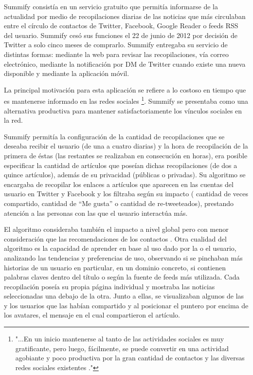 Summify\cite{summify} consistía en un servicio gratuito que permitía informarse de la actualidad por medio de recopilaciones diarias de las noticias que más circulaban entre el círculo de contactos de Twitter, Facebook, Google Reader o feeds RSS del usuario. Summify cesó sus funciones el 22 de junio de 2012 por decisión de Twitter a solo cinco meses de comprarlo. Summify entregaba su servicio de distintas formas: mediante la web para revisar las recopilaciones, vía correo electrónico, mediante la notificación por DM de Twitter cuando existe una nueva disponible y mediante la aplicación móvil.

La principal motivación para esta aplicación se refiere a lo costoso en tiempo que es mantenerse informado en las redes sociales \footnote{"...En un inicio mantenerse al tanto de las actividades sociales es muy gratificante, pero luego, fácilmente, se puede convertir en una actividad agobiante y poco productiva por la gran cantidad de contactos y las diversas redes sociales existentes \cite{summifyvideo}."}. Summify se presentaba como una alternativa productiva para mantener satisfactoriamente los vínculos sociales en la red.

Summify permitía la configuración de la cantidad de recopilaciones que se deseaba recibir el usuario (de una a cuatro diarias) y la hora de recopilación de la primera de éstas (las restantes se realizaban en consecución en horas), era posible especificar la cantidad de artículos que poseían dichas recopilaciones (de dos a quince artículos), además de su privacidad (públicas o privadas). Su algoritmo se encargaba de recopilar los enlaces a artículos que aparecen en las cuentas del usuario en Twitter y Facebook y los filtraba según su impacto ( cantidad de veces compartido, cantidad de “Me gusta” o cantidad de re-tweeteados), prestando atención a las personas con las que el usuario interactúa más. 

El algoritmo consideraba también el impacto a nivel global pero con menor consideración que las recomendaciones de los contactos \cite{summifyblog}. Otra cualidad del algoritmo es la capacidad de aprender en base al uso dado por la o el usuario, analizando las tendencias y preferencias de uso, observando si se pinchaban más historias de un usuario en particular, en un dominio concreto, si contienen palabras claves dentro del título o según la fuente de feeds más utilizada. Cada recopilación poseía su propia página individual y mostraba las noticias seleccionadas una debajo de la otra. Junto a ellas, se visualizaban algunos de las y los usuarios que las habían compartido y al posicionar el puntero por encima de los avatares, el mensaje en el cual compartieron el artículo.

